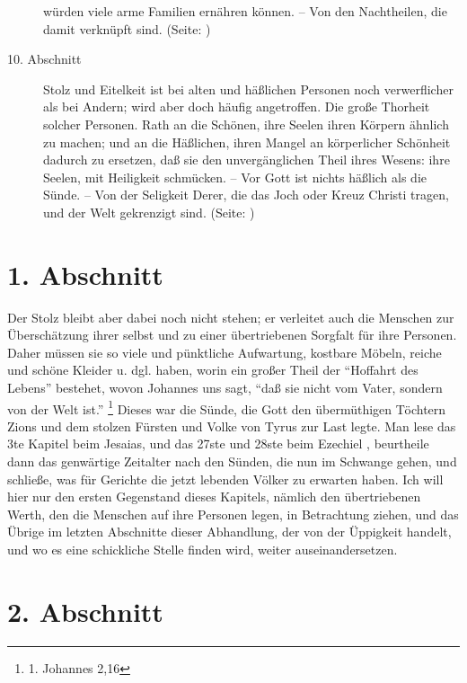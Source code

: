 \begin{description}
würden viele arme Familien ernähren können. -- Von den Nachtheilen, die damit
verknüpft sind. (Seite: \pageref{kap11_ab9})
\item[10. Abschnitt] Stolz und Eitelkeit ist bei alten und häßlichen Personen
noch verwerflicher als bei Andern; wird aber doch häufig angetroffen. Die große
Thorheit solcher Personen. Rath an die Schönen, ihre Seelen ihren Körpern
ähnlich zu machen; und an die Häßlichen, ihren Mangel an körperlicher Schönheit
dadurch zu ersetzen, daß sie den unvergänglichen Theil ihres Wesens: ihre
Seelen, mit Heiligkeit schmücken. -- Vor Gott ist nichts häßlich als die Sünde.
-- Von der Seligkeit Derer, die das Joch oder Kreuz Christi tragen, und der Welt
gekrenzigt sind. (Seite: \pageref{kap11_ab10})

\end{description}
\normalsize

\section{1. Abschnitt} \label{kap11_ab1}

Der Stolz bleibt aber dabei noch nicht stehen; er verleitet auch die Menschen
zur Überschätzung ihrer selbst und zu einer übertriebenen Sorgfalt für ihre
Personen. Daher müssen sie so viele und pünktliche Aufwartung, kostbare
Möbeln,
reiche und schöne Kleider u. dgl. haben, worin ein großer Theil
der "`Hoffahrt
des Lebens"' bestehet, wovon Johannes uns sagt,
"`daß sie nicht vom Vater,
sondern von der Welt ist."'
\footnote{1. Johannes 2,16}
Dieses war die Sünde, die Gott
den übermüthigen Töchtern Zions und dem stolzen
Fürsten und Volke von Tyrus zur
Last legte. Man lese das 3te Kapitel beim Jesaias, und das 27ste und 28ste beim
Ezechiel ,
beurtheile dann das genwärtige Zeitalter nach den Sünden, die nun im
Schwange gehen, und schließe, was für Gerichte die jetzt lebenden Völker zu
erwarten haben. Ich will hier nur den ersten Gegenstand dieses Kapitels, nämlich
den übertriebenen Werth, den die Menschen auf ihre Personen legen, in
Betrachtung ziehen, und das Übrige im letzten Abschnitte dieser Abhandlung, der
von der Üppigkeit handelt, und wo es eine schickliche Stelle finden wird,
weiter auseinandersetzen.

\section{2. Abschnitt} \label{kap11_ab2}

